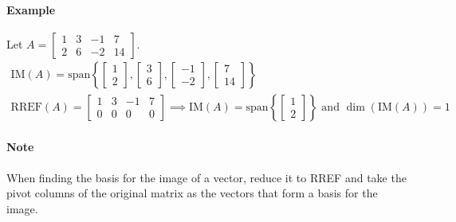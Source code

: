 \paragraph*{Example}
Let $A = \begin{bmatrix}
      1 & 3 & -1 & 7 \\
      2 & 6 & -2 & 14
\end{bmatrix}$.
\begin{align*}
    \text{IM}(A) = \text{span} \left\{ \begin{bmatrix}
        1 \\
        2
    \end{bmatrix}, \begin{bmatrix}
        3 \\
        6
    \end{bmatrix}, \begin{bmatrix}
        -1 \\
        -2
    \end{bmatrix}, \begin{bmatrix}
        7 \\
        14
    \end{bmatrix} \right\} \\
    \text{RREF}(A) = \begin{bmatrix}
        1 & 3 & -1 & 7 \\
        0 & 0 & 0 & 0
    \end{bmatrix} \implies \text{IM}(A) = \text{span} \left\{ \begin{bmatrix}
        1 \\
        2
    \end{bmatrix} \right\} \text{ and } \dim(\text{IM}(A)) = 1
\end{align*}

\paragraph*{Note}
When finding the basis for the image of a vector, reduce it to RREF and take the pivot columns of the original matrix as the vectors that form a basis for the image.